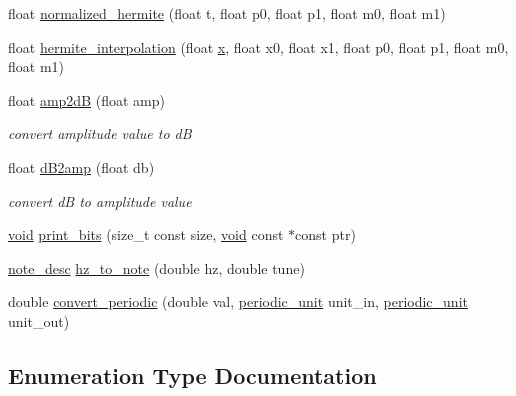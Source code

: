 \begin{DoxyCompactItemize}
float \hyperlink{namespacedsp_a91d4003f1af255de0db6beb7faf427bf}{normalized\+\_\+hermite} (float t, float p0, float p1, float m0, float m1)
\item 
float \hyperlink{namespacedsp_ac0207ae3cdfdaabef07e1ee2d54b86c9}{hermite\+\_\+interpolation} (float \hyperlink{tk_8h_a61ebd54d47cc56787649a3b8f126bda1}{x}, float x0, float x1, float p0, float p1, float m0, float m1)
\item 
float \hyperlink{namespacedsp_af441d67e5db3daed2a36c4641b6bf29f}{amp2dB} (float amp)
\begin{DoxyCompactList}\small\item\em convert amplitude value to dB \end{DoxyCompactList}\item 
float \hyperlink{namespacedsp_a726ba9431c151f703cc5a69eb5aa6209}{d\+B2amp} (float db)
\begin{DoxyCompactList}\small\item\em convert dB to amplitude value \end{DoxyCompactList}\item 
\hyperlink{tk_8h_aba408b7cd755a96426e004c015f5de8e}{void} \hyperlink{namespacedsp_ac0591aa52b45eacee9c26d4e098aad47}{print\+\_\+bits} (size\+\_\+t const size, \hyperlink{tk_8h_aba408b7cd755a96426e004c015f5de8e}{void} const $\ast$const ptr)
\item 
\hyperlink{structdsp_1_1note__desc}{note\+\_\+desc} \hyperlink{namespacedsp_a9d37528f13e4cc1cf77ddfc452b32f22}{hz\+\_\+to\+\_\+note} (double hz, double tune)
\item 
double \hyperlink{namespacedsp_a55af7e479ebf261c36067396e682b83b}{convert\+\_\+periodic} (double val, \hyperlink{namespacedsp_a62db0a3af67183c65a28083fe474f349}{periodic\+\_\+unit} unit\+\_\+in, \hyperlink{namespacedsp_a62db0a3af67183c65a28083fe474f349}{periodic\+\_\+unit} unit\+\_\+out)
\end{DoxyCompactItemize}


\subsection{Enumeration Type Documentation}
